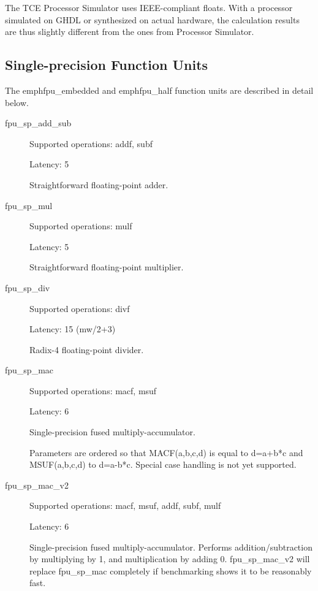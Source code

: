 \documentclass[twoside]{tceusermanual}
\begin{document}
The TCE Processor Simulator uses IEEE-compliant floats. With a processor simulated on GHDL or 
synthesized on actual hardware, the calculation results are thus slightly different from the 
ones from Processor Simulator.

\subsection{Single-precision Function Units}

The emph{fpu\_embedded} and emph{fpu\_half} function units are described in detail below.


\begin{description}
 \item[fpu\_sp\_add\_sub]

Supported operations: addf, subf

Latency: 5

Straightforward floating-point adder.

 \item[fpu\_sp\_mul]

Supported operations:         mulf

Latency:             5

Straightforward floating-point multiplier.

\item[fpu\_sp\_div]

Supported operations:         divf

Latency:             15 (mw/2+3)

Radix-4 floating-point divider.

\item[fpu\_sp\_mac]

Supported operations:         macf, msuf

Latency:             6

Single-precision fused multiply-accumulator.

Parameters are ordered so that MACF(a,b,c,d) is equal to d=a+b*c and MSUF(a,b,c,d) to d=a-b*c. Special case handling is not yet supported.

\item[fpu\_sp\_mac\_v2]

Supported operations:         macf, msuf, addf, subf, mulf

Latency:             6

Single-precision fused multiply-accumulator. Performs addition/subtraction by multiplying by 1,
and multiplication by adding 0. fpu\_sp\_mac\_v2 will replace fpu\_sp\_mac completely if benchmarking shows it
to be reasonably fast.


\end{description}
\end{document}
